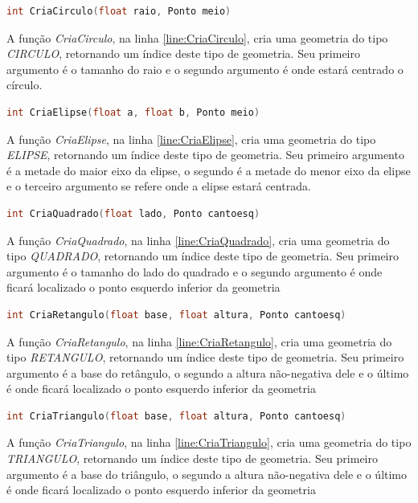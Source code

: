 \begin{lstlisting}[label={func:CriaCirculo},language=C++]
int CriaCirculo(float raio, Ponto meio)
\end{lstlisting}
A função \emph{CriaCirculo}, na linha \ref{line:CriaCirculo}, cria uma geometria do tipo \emph{CIRCULO}, retornando um índice deste tipo de geometria. Seu primeiro argumento é o tamanho do raio e o segundo argumento é onde estará centrado o círculo.

\begin{lstlisting}[label={func:CriaElipse},language=C++]
int CriaElipse(float a, float b, Ponto meio)
\end{lstlisting}
A função \emph{CriaElipse}, na linha \ref{line:CriaElipse}, cria uma geometria do tipo \emph{ELIPSE}, retornando um índice deste tipo de geometria. Seu primeiro argumento é a metade do maior eixo da elipse, o segundo é a metade do menor eixo da elipse e o terceiro argumento se refere onde a elipse estará centrada.

\begin{lstlisting}[label={func:CriaQuadrado},language=C++]
int CriaQuadrado(float lado, Ponto cantoesq)
\end{lstlisting}
A função \emph{CriaQuadrado}, na linha \ref{line:CriaQuadrado}, cria uma geometria do tipo \emph{QUADRADO}, retornando um índice deste tipo de geometria. Seu primeiro argumento é o tamanho do lado do quadrado e o segundo argumento é onde ficará localizado o ponto esquerdo inferior da geometria

\begin{lstlisting}[label={func:CriaRetangulo},language=C++]
int CriaRetangulo(float base, float altura, Ponto cantoesq)
\end{lstlisting}
A função \emph{CriaRetangulo}, na linha \ref{line:CriaRetangulo}, cria uma geometria do tipo \emph{RETANGULO}, retornando um índice deste tipo de geometria. Seu primeiro argumento é a base do retângulo, o segundo a altura não-negativa dele e o último é onde ficará localizado o ponto esquerdo inferior da geometria

\begin{lstlisting}[label={func:CriaTriangulo},language=C++]
int CriaTriangulo(float base, float altura, Ponto cantoesq)
\end{lstlisting}
A função \emph{CriaTriangulo}, na linha \ref{line:CriaTriangulo}, cria uma geometria do tipo \emph{TRIANGULO}, retornando um índice deste tipo de geometria. Seu primeiro argumento é a base do triângulo, o segundo a altura não-negativa dele e o último é onde ficará localizado o ponto esquerdo inferior da geometria

